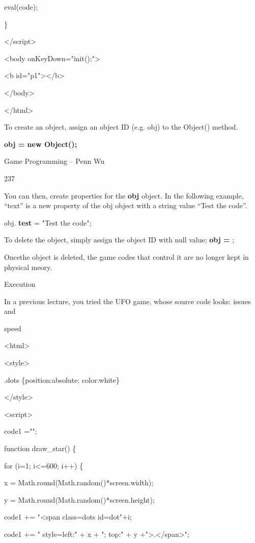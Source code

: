 \documentclass[
]{article}
\begin{document}
eval(code);

\}

\textless/script\textgreater{}

\textless body onKeyDown="init();"\textgreater{}

\textless b id="p1"\textgreater\textless/b\textgreater{}

\textless/body\textgreater{}

\textless/html\textgreater{}

To create an object, assign an object ID (e.g. obj) to the Object()
method.

\textbf{obj = new Object();}

Game Programming -- Penn Wu

237

\protect\hypertarget{index_split_012.htmlux5cux23p238}{}{}You can then,
create properties for the \textbf{obj} object. In the following example,
``text'' is a new property of the obj object with a string value ``Test
the code''.

obj. \textbf{test} = "Test the code";

To delete the object, simply assign the object ID with null value;
\textbf{obj = \textquotesingle\textquotesingle{}} ;

Oncethe object is deleted, the game codes that control it are no longer
kept in physical meory.

Execution

In a previous lecture, you tried the UFO game, whose source code looks:
issues and

speed

\textless html\textgreater{}

\textless style\textgreater{}

.dots \{position:absolute; color:white\}

\textless/style\textgreater{}

\textless script\textgreater{}

code1 ="";

function draw\_star() \{

for (i=1; i\textless=600; i++) \{

x = Math.round(Math.random()*screen.width);

y = Math.round(Math.random()*screen.height);

code1 += "\textless span class=dots id=dot"+i;

code1 += " style=\textquotesingle left:" + x + "; top:" + y
+"\textquotesingle\textgreater.\textless/span\textgreater";
\end{document}
